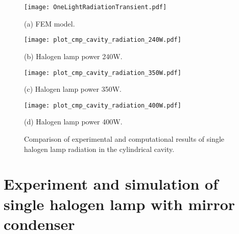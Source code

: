 \begin{figure}
  \begin{minipage}[t]{0.5\linewidth} %
  \nonumber
    \centering
    \texttt{[image: OneLightRadiationTransient.pdf]}
    \centerline{(a) FEM model.}
    \label{Fig:OneLightRadiationTransient}
  \end{minipage}%
  \begin{minipage}[t]{0.5\linewidth}
    \centering
    \texttt{[image: plot\_cmp\_cavity\_radiation\_240W.pdf]}
    \centerline{(b) Halogen lamp power 240W.}
    \label{Fig:Compare240W}
  \end{minipage}

    \begin{minipage}[t]{0.5\linewidth} %
  \nonumber
    \centering
    \texttt{[image: plot\_cmp\_cavity\_radiation\_350W.pdf]}
    \centerline{(c) Halogen lamp power 350W.}
    \label{Fig:Compare350W}
  \end{minipage}%
  \begin{minipage}[t]{0.5\linewidth}
    \centering
    \texttt{[image: plot\_cmp\_cavity\_radiation\_400W.pdf]}
    \centerline{(d) Halogen lamp power 400W.}
    \label{Fig:Compare400W}
  \end{minipage}
  \caption{Comparison of experimental and computational results of single halogen lamp radiation in the cylindrical cavity.}
  \label{Fig:OneLightRadiationSimulation}
\end{figure}



\section{Experiment and simulation of single halogen lamp with mirror condenser}

